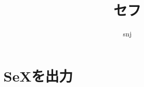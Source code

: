 \documentclass{jsarticle}
\title{セフ}
\author{snj}
\begin{document}
\maketitle
\section{SeXを出力}
\SeX
\end{document}
